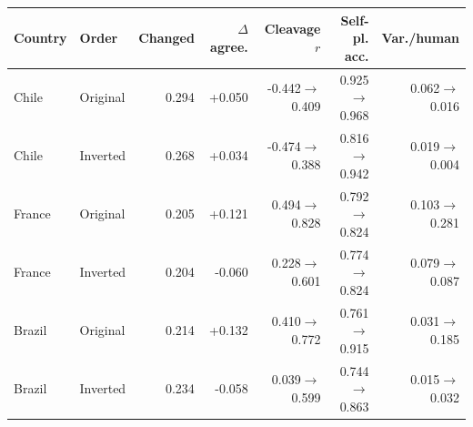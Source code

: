 \begin{tabular}{llrrrrr}
\toprule
Country & Order & Changed & $\Delta$ agree. & Cleavage $r$ & Self-pl. acc. & Var./human \\
\midrule
Chile & Original & 0.294 & +0.050 & -0.442$\rightarrow$0.409 & 0.925$\rightarrow$0.968 & 0.062$\rightarrow$0.016 \\
Chile & Inverted & 0.268 & +0.034 & -0.474$\rightarrow$0.388 & 0.816$\rightarrow$0.942 & 0.019$\rightarrow$0.004 \\
France & Original & 0.205 & +0.121 & 0.494$\rightarrow$0.828 & 0.792$\rightarrow$0.824 & 0.103$\rightarrow$0.281 \\
France & Inverted & 0.204 & -0.060 & 0.228$\rightarrow$0.601 & 0.774$\rightarrow$0.824 & 0.079$\rightarrow$0.087 \\
Brazil & Original & 0.214 & +0.132 & 0.410$\rightarrow$0.772 & 0.761$\rightarrow$0.915 & 0.031$\rightarrow$0.185 \\
Brazil & Inverted & 0.234 & -0.058 & 0.039$\rightarrow$0.599 & 0.744$\rightarrow$0.863 & 0.015$\rightarrow$0.032 \\
\bottomrule
\end{tabular}
